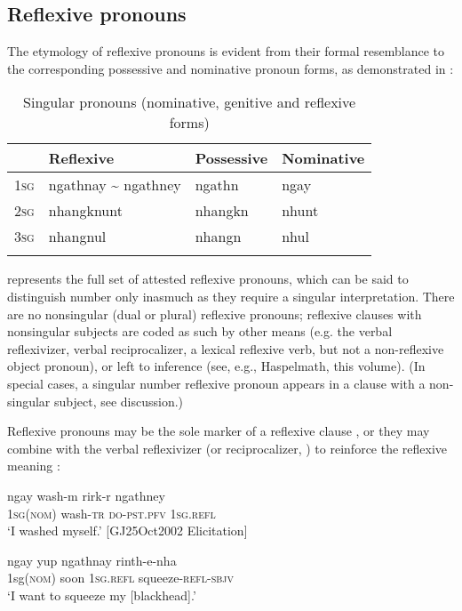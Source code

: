 \documentclass[output=paper]{langscibook}
\begin{document}
\subsection{Reflexive pronouns}\label{sec:Gaby:2.2}
The etymology of reflexive pronouns is evident from their formal resemblance to the corresponding possessive and nominative pronoun forms, as demonstrated in :

\begin{table}
\begin{tabularx}{0.7\textwidth}{XXXX}
\lsptoprule
& {Reflexive} & {Possessive} & {Nominative}\\
\hline
\textsc{1sg} & {ngathnay} {{\textasciitilde} ngathney} & {ngathn} & {ngay}\\
\textsc{2sg} & {nhangknunt} & {nhangkn} & {nhunt}\\
\textsc{3sg} & {nhangnul} & {nhangn} & {nhul}\\
\lspbottomrule
\end{tabularx}
\caption{Singular pronouns (nominative, genitive and reflexive forms)}\label{tab:Gaby:3}
\end{table}




 represents the full set of attested reflexive pronouns, which can be said to distinguish number only inasmuch as they require a singular interpretation. There are no nonsingular (dual or plural) reflexive pronouns; reflexive clauses with nonsingular subjects are coded as such by other means (e.g. the verbal reflexivizer, verbal reciprocalizer, a lexical reflexive verb, but not a non-reflexive object pronoun), or left to inference (see, e.g., Haspelmath, this volume). (In special cases, a singular number reflexive pronoun appears in a clause with a non-singular subject, see  discussion.)

Reflexive pronouns may be the sole marker of a reflexive clause , or they may combine with the verbal reflexivizer (or reciprocalizer, ) to reinforce the reflexive meaning :

\ea 
    \label{ex:Gaby:1}
    \gll ngay wash-m rirk-r ngathney\\
   \textsc{\textsc{1sg}}(\textsc{nom})  wash-\textsc{tr}  \textsc{do}{}-\textsc{pst.pfv} \textsc{1sg}.\textsc{refl} \\
    \glt  ‘I washed myself.’ [GJ25Oct2002 Elicitation]
\z
    
    
\ea 
    \label{ex:Gaby:2}
    \gll ngay yup ngathnay rinth-e-nha\\
    1sg\textsc{(nom)}  soon  1\textsc{sg}.\textsc{refl}  squeeze-\textsc{refl}{}-\textsc{sbjv}\\
    \glt ‘I want to squeeze my [blackhead].’ \citep[121]{Hall1972}
\z
 
\end{document}
